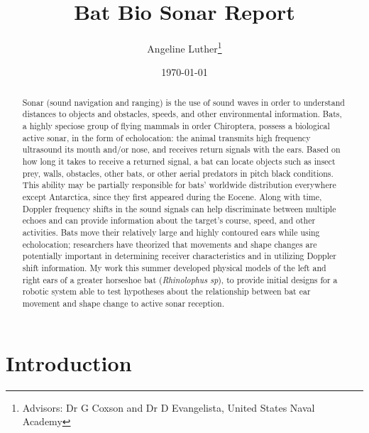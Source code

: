 \documentclass{article}
\title{Bat Bio Sonar Report}
\author{Angeline Luther\thanks{Advisors: Dr G Coxson and Dr D Evangelista, United States Naval Academy}}
\date{\today}
\begin{document}
\maketitle

\begin{abstract}
Sonar (sound navigation and ranging) is the use of sound waves in order to understand distances to objects and obstacles, speeds, and other environmental information.  Bats, a highly speciose group of flying mammals in order Chiroptera, possess a biological active sonar, in the form of echolocation: the animal transmits high frequency ultrasound its mouth and/or nose, and receives return signals with the ears.  Based on how long it takes to receive a returned signal, a bat can locate objects such as insect prey, walls, obstacles, other bats, or other aerial predators in pitch black conditions. This ability may be partially responsible for bats' worldwide distribution everywhere except Antarctica, since they first appeared during the Eocene. Along with time, Doppler frequency shifts in the sound signals can help discriminate between multiple echoes and can provide information about the target's course, speed, and other activities. Bats move their relatively large and highly contoured ears while using echolocation; researchers have theorized that movements and shape changes are potentially important in determining receiver characteristics and in utilizing Doppler shift information. My work this summer developed physical models of the left and right ears of a greater horseshoe bat (\emph{Rhinolophus sp}), to provide initial designs for a robotic system able to test hypotheses about the relationship between bat ear movement and shape change to active sonar reception.  
\end{abstract}

\section{Introduction}
\end{document}
